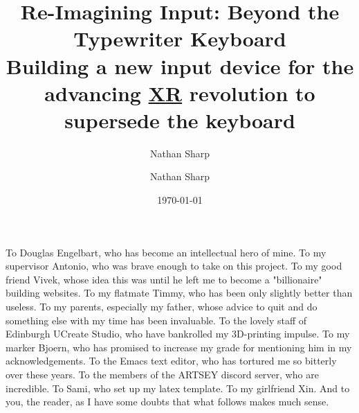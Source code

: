 \documentclass[logo,bsc,singlespacing,parskip]{infthesis}
\author{Nathan Sharp}
\date{\today}
\title{Re-Imagining Input: Beyond the Typewriter Keyboard\\\medskip
\large Building a new input device for the advancing \hyperref[org39cbd51]{XR} revolution to supersede the keyboard}
\begin{document}
\begin{preliminary}
\author{Nathan Sharp}

\newenvironment{ethics}
  {\begin{frontenv}{Research Ethics Approval}{\LARGE}}
  {\end{frontenv}\newpage}


\maketitle

\begin{acknowledgements}
To Douglas Engelbart, who has become an intellectual hero of mine.
To my supervisor Antonio, who was brave enough to take on this project.
To my good friend Vivek, whose idea this was until he left me to become a "billionaire" building websites.
To my flatmate Timmy, who has been only slightly better than useless.
To my parents, especially my father, whose advice to quit and do something else with my time has been invaluable.
To the lovely staff of Edinburgh UCreate Studio, who have bankrolled my 3D-printing impulse.
To my marker Bjoern, who has promised to increase my grade for mentioning him in my acknowledgements.
To the Emacs text editor, who has tortured me so bitterly over these years.
To the members of the ARTSEY discord server, who are incredible.
To Sami, who set up my latex template.
To my girlfriend Xin.
And to you, the reader, as I have some doubts that what follows makes much sense.
\end{acknowledgements}


\end{preliminary}
\end{document}

